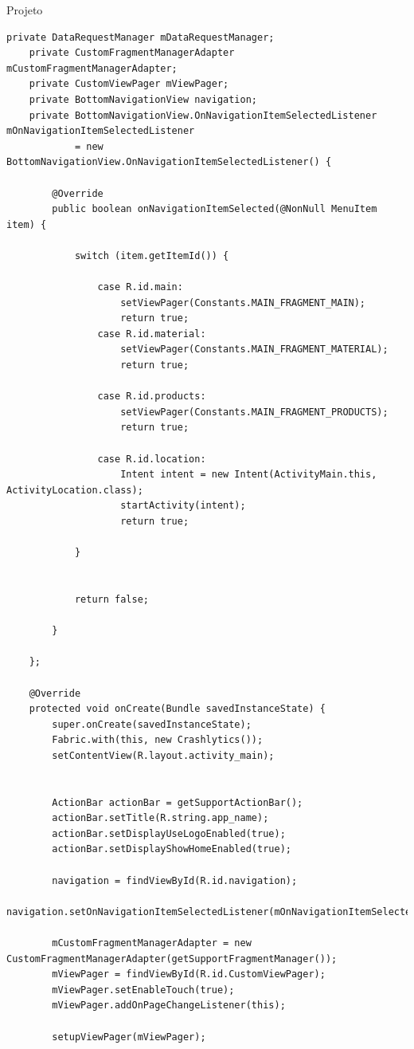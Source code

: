 \documentclass[
	12pt,				%
	openright,			%
	twoside,			%
	a4paper,			%
	english,			%
	french,				%
	spanish,			%
	brazil				%
	]{abntex2}
\begin{document}
\begin{chapter}{Projeto}
\begin{lstlisting}[numbers=none,
basicstyle=\small,
caption={MainActivity.java},
title={MainActivity.java},
label={MainActivity.java}]
    private DataRequestManager mDataRequestManager;
    private CustomFragmentManagerAdapter mCustomFragmentManagerAdapter;
    private CustomViewPager mViewPager;
    private BottomNavigationView navigation;
    private BottomNavigationView.OnNavigationItemSelectedListener mOnNavigationItemSelectedListener
            = new BottomNavigationView.OnNavigationItemSelectedListener() {

        @Override
        public boolean onNavigationItemSelected(@NonNull MenuItem item) {

            switch (item.getItemId()) {

                case R.id.main:
                    setViewPager(Constants.MAIN_FRAGMENT_MAIN);
                    return true;
                case R.id.material:
                    setViewPager(Constants.MAIN_FRAGMENT_MATERIAL);
                    return true;

                case R.id.products:
                    setViewPager(Constants.MAIN_FRAGMENT_PRODUCTS);
                    return true;

                case R.id.location:
                    Intent intent = new Intent(ActivityMain.this, ActivityLocation.class);
                    startActivity(intent);
                    return true;

            }


            return false;

        }

    };

    @Override
    protected void onCreate(Bundle savedInstanceState) {
        super.onCreate(savedInstanceState);
        Fabric.with(this, new Crashlytics());
        setContentView(R.layout.activity_main);


        ActionBar actionBar = getSupportActionBar();
        actionBar.setTitle(R.string.app_name);
        actionBar.setDisplayUseLogoEnabled(true);
        actionBar.setDisplayShowHomeEnabled(true);
      
        navigation = findViewById(R.id.navigation);
        navigation.setOnNavigationItemSelectedListener(mOnNavigationItemSelectedListener);

        mCustomFragmentManagerAdapter = new CustomFragmentManagerAdapter(getSupportFragmentManager());
        mViewPager = findViewById(R.id.CustomViewPager);
        mViewPager.setEnableTouch(true);
        mViewPager.addOnPageChangeListener(this);

        setupViewPager(mViewPager);


\end{lstlisting}
\end{chapter}
\end{document}
